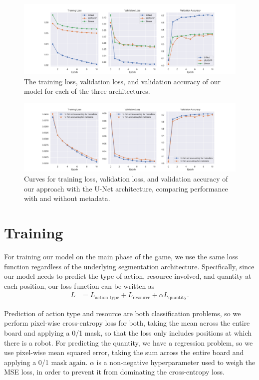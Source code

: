 \documentclass[10pt,twocolumn,letterpaper]{article}
\begin{document}
\begin{figure}
  \centering
  \includegraphics[width=\textwidth]{figures/results.png}
  \caption{
    The training loss, validation loss, and validation
    accuracy of our model for each of the three architectures.
  }
  \label{fig:results}
\end{figure}

\begin{figure}
  \centering
  \includegraphics[width=\textwidth]{figures/unet_meta.png}
  \caption{%
    Curves for training loss, validation loss, and validation
    accuracy of our approach with the U-Net architecture,
    comparing performance with and without metadata.
  }
  \label{fig:u_net}
\end{figure}

\section{Training}
\label{sec:training}

For training our model on the main phase of the game, we use the same
loss function regardless of the underlying segmentation architecture.
Specifically, since our model needs to predict the type of action, resource
involved, and quantity at each position, our loss function can be written as
\begin{align}
  \label{eq:train_loss}
  L &=
    L_{\text{action type}}
    + L_{\text{resource}}
    + \alpha L_{\text{quantity}}.
\end{align}

Prediction of action type and resource are both classification problems, so
we perform pixel-wise cross-entropy loss for both, taking the mean across the
entire board and applying a 0/1 mask, so that the loss only includes positions
at which there is a robot.
For predicting the quantity, we have a regression problem,
so we use pixel-wise mean squared error, taking the sum
across the entire board and applying a 0/1 mask again.
$\alpha$ is a non-negative hyperparameter used to weigh the MSE
loss, in order to prevent it from dominating the cross-entropy loss.
\end{document}
